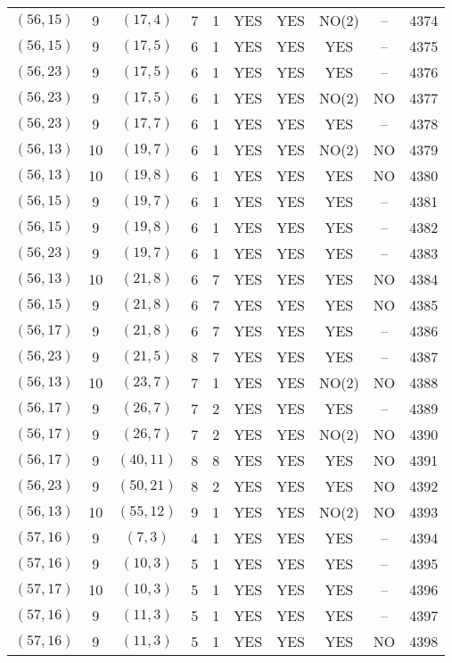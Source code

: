 \begin{longtable}{|c|c|c|c|c|c|c|c|c|c|}
$(56, 15)$ & 9 & $(17, 4)$ & 7 & 1 & YES & YES & NO(2) & -- & 4374\\
$(56, 15)$ & 9 & $(17, 5)$ & 6 & 1 & YES & YES & YES & -- & 4375\\
$(56, 23)$ & 9 & $(17, 5)$ & 6 & 1 & YES & YES & YES & -- & 4376\\
$(56, 23)$ & 9 & $(17, 5)$ & 6 & 1 & YES & YES & NO(2) & NO & 4377\\
$(56, 23)$ & 9 & $(17, 7)$ & 6 & 1 & YES & YES & YES & -- & 4378\\
$(56, 13)$ & 10 & $(19, 7)$ & 6 & 1 & YES & YES & NO(2) & NO & 4379\\
$(56, 13)$ & 10 & $(19, 8)$ & 6 & 1 & YES & YES & YES & NO & 4380\\
$(56, 15)$ & 9 & $(19, 7)$ & 6 & 1 & YES & YES & YES & -- & 4381\\
$(56, 15)$ & 9 & $(19, 8)$ & 6 & 1 & YES & YES & YES & -- & 4382\\
$(56, 23)$ & 9 & $(19, 7)$ & 6 & 1 & YES & YES & YES & -- & 4383\\
$(56, 13)$ & 10 & $(21, 8)$ & 6 & 7 & YES & YES & YES & NO & 4384\\
$(56, 15)$ & 9 & $(21, 8)$ & 6 & 7 & YES & YES & YES & NO & 4385\\
$(56, 17)$ & 9 & $(21, 8)$ & 6 & 7 & YES & YES & YES & -- & 4386\\
$(56, 23)$ & 9 & $(21, 5)$ & 8 & 7 & YES & YES & YES & -- & 4387\\
$(56, 13)$ & 10 & $(23, 7)$ & 7 & 1 & YES & YES & NO(2) & NO & 4388\\
$(56, 17)$ & 9 & $(26, 7)$ & 7 & 2 & YES & YES & YES & -- & 4389\\
$(56, 17)$ & 9 & $(26, 7)$ & 7 & 2 & YES & YES & NO(2) & NO & 4390\\
$(56, 17)$ & 9 & $(40, 11)$ & 8 & 8 & YES & YES & YES & NO & 4391\\
$(56, 23)$ & 9 & $(50, 21)$ & 8 & 2 & YES & YES & YES & NO & 4392\\
$(56, 13)$ & 10 & $(55, 12)$ & 9 & 1 & YES & YES & NO(2) & NO & 4393\\
$(57, 16)$ & 9 & $(7, 3)$ & 4 & 1 & YES & YES & YES & -- & 4394\\
$(57, 16)$ & 9 & $(10, 3)$ & 5 & 1 & YES & YES & YES & -- & 4395\\
$(57, 17)$ & 10 & $(10, 3)$ & 5 & 1 & YES & YES & YES & -- & 4396\\
$(57, 16)$ & 9 & $(11, 3)$ & 5 & 1 & YES & YES & YES & -- & 4397\\
$(57, 16)$ & 9 & $(11, 3)$ & 5 & 1 & YES & YES & YES & NO & 4398\\

\end{longtable}
